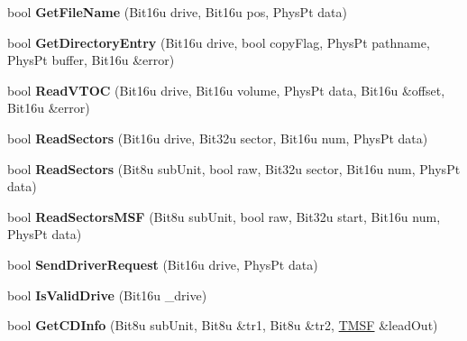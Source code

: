 \begin{DoxyCompactItemize}
\item 
\hypertarget{classCMscdex_aa02670c6961dddbe44b9330d6422712b}{bool {\bfseries Get\-File\-Name} (Bit16u drive, Bit16u pos, Phys\-Pt data)}\label{classCMscdex_aa02670c6961dddbe44b9330d6422712b}

\item 
\hypertarget{classCMscdex_a7af859df94d70eea08c953571a54ed36}{bool {\bfseries Get\-Directory\-Entry} (Bit16u drive, bool copy\-Flag, Phys\-Pt pathname, Phys\-Pt buffer, Bit16u \&error)}\label{classCMscdex_a7af859df94d70eea08c953571a54ed36}

\item 
\hypertarget{classCMscdex_ad0746c59d6eaee8c20d5267bec58a09b}{bool {\bfseries Read\-V\-T\-O\-C} (Bit16u drive, Bit16u volume, Phys\-Pt data, Bit16u \&offset, Bit16u \&error)}\label{classCMscdex_ad0746c59d6eaee8c20d5267bec58a09b}

\item 
\hypertarget{classCMscdex_ac97e8044bbe54cd19c9b1ffd2dcdb23b}{bool {\bfseries Read\-Sectors} (Bit16u drive, Bit32u sector, Bit16u num, Phys\-Pt data)}\label{classCMscdex_ac97e8044bbe54cd19c9b1ffd2dcdb23b}

\item 
\hypertarget{classCMscdex_a41e035bc2ef5add4d2d5e4b3cdb01178}{bool {\bfseries Read\-Sectors} (Bit8u sub\-Unit, bool raw, Bit32u sector, Bit16u num, Phys\-Pt data)}\label{classCMscdex_a41e035bc2ef5add4d2d5e4b3cdb01178}

\item 
\hypertarget{classCMscdex_a8952511925ddd8c658dce7fd0824f2f6}{bool {\bfseries Read\-Sectors\-M\-S\-F} (Bit8u sub\-Unit, bool raw, Bit32u start, Bit16u num, Phys\-Pt data)}\label{classCMscdex_a8952511925ddd8c658dce7fd0824f2f6}

\item 
\hypertarget{classCMscdex_a2ab48935a7a8fd4292f3028243ab2b66}{bool {\bfseries Send\-Driver\-Request} (Bit16u drive, Phys\-Pt data)}\label{classCMscdex_a2ab48935a7a8fd4292f3028243ab2b66}

\item 
\hypertarget{classCMscdex_ad2c618001752751ad46861969ac08b01}{bool {\bfseries Is\-Valid\-Drive} (Bit16u \-\_\-drive)}\label{classCMscdex_ad2c618001752751ad46861969ac08b01}

\item 
\hypertarget{classCMscdex_ade59cf8040558852abb1dfbcec7189ad}{bool {\bfseries Get\-C\-D\-Info} (Bit8u sub\-Unit, Bit8u \&tr1, Bit8u \&tr2, \hyperlink{structSMSF}{T\-M\-S\-F} \&lead\-Out)}\label{classCMscdex_ade59cf8040558852abb1dfbcec7189ad}


\end{DoxyCompactItemize}

